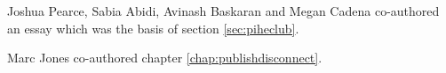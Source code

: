 \documentclass[
	fontsize=10pt, %
	twoside=false, %
	secnumdepth=1, %
]{kaobook}
\begin{document}
Joshua Pearce, Sabia Abidi, Avinash Baskaran and Megan Cadena co-authored an essay which was the basis of section \ref{sec:piheclub}.

Marc Jones co-authored chapter \ref{chap:publishdisconnect}.


\backmatter %



\printbibliography[heading=bibintoc, title=Bibliography, prenote=bibnote] %



\printindex %
\end{document}
